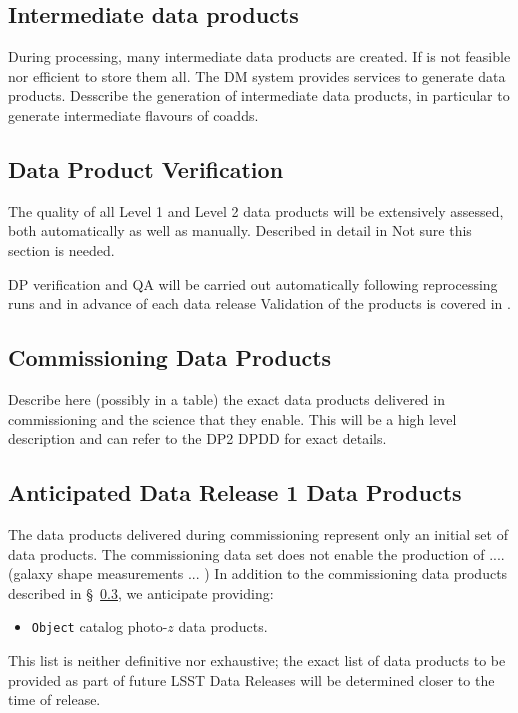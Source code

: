 \subsection{Intermediate data products}
During processing, many intermediate data products are created. If is not feasible nor efficient to store them all. 
The DM system provides services to generate data products. 
Desscribe the generation of intermediate data products, in particular to generate intermediate flavours of coadds. 


\subsection{Data Product Verification}
The quality of all Level 1 and Level 2 data products will be extensively assessed, both automatically as well as manually. 
Described in detail in \cite{PSTN-024}
Not sure this section is needed. 

DP verification and QA will be carried out automatically following reprocessing runs and in advance of each data release 
Validation of the products is covered in \cite{PSTN-024}.

\subsection{Commissioning Data Products}  \label{sec:dp-commissioning}
Describe here (possibly in a table) the exact data products delivered in commissioning and the science that they enable. 
This will be a high level description and can refer to the DP2 DPDD for exact details. 

\subsection{Anticipated Data Release 1 Data Products} \label{sec:dp-dr1}

The data products delivered during commissioning represent only an initial set of data products. 
The commissioning data set does not enable the production of .... (galaxy shape measurements ... )
In addition to the commissioning data products described in \S~\ref{sec:dp-commissioning}, we anticipate providing: 

\begin{itemize}
\item {\tt Object} catalog photo-$z$ data products.
\end{itemize}
This list is neither definitive nor exhaustive; the exact list of data products to be provided as part of future LSST Data Releases will be determined closer to the time of release. 


